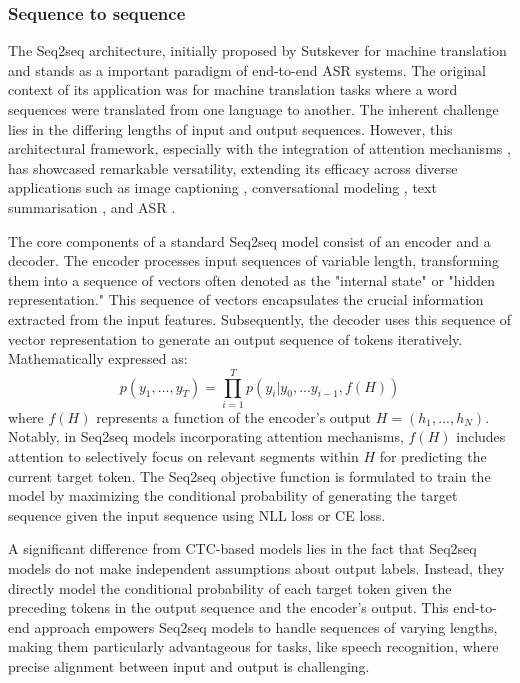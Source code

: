 \subsubsection{Sequence to sequence}
The \ac{Seq2seq} architecture, initially proposed by Sutskever for machine translation \cite{sutskever2014sequence} and stands as a important paradigm of end-to-end \ac{ASR} systems. The original context of its application was for machine translation tasks where a word sequences were translated from one language to another. The inherent challenge lies in the differing lengths of input and output sequences. However, this architectural framework, especially with the integration of attention mechanisms \cite{bahdanau2014neural}, has showcased remarkable versatility, extending its efficacy across diverse applications such as image captioning \cite{seq2seq_imagecaption}, conversational modeling \cite{vinyals2015neural}, text summarisation \cite{nallapati2016abstractive}, and \ac{ASR} \cite{dong2018speech}.

The core components of a standard \ac{Seq2seq} model consist of an encoder and a decoder. The encoder processes input sequences of variable length, transforming them into a sequence of vectors often denoted as the "internal state" or "hidden representation." This sequence of vectors encapsulates the crucial information extracted from the input features. Subsequently, the decoder uses this sequence of vector representation to generate an output sequence of tokens iteratively. Mathematically expressed as:
\begin{equation}
    p(y_1,...,y_T) = \prod_{i=1}^{T} p(y_i| y_0,...y_{i-1}, f(H))
\end{equation}
where $f(H)$ represents a function of the encoder's output $H = (h_1, ..., h_N)$. Notably, in \ac{Seq2seq} models incorporating attention mechanisms, $f(H)$ includes attention to selectively focus on relevant segments within $H$ for predicting the current target token. The \ac{Seq2seq} objective function is formulated to train the model by maximizing the conditional probability of generating the target sequence given the input sequence using \ac{NLL} loss or \ac{CE} loss.

A significant difference from \ac{CTC}-based models lies in the fact that \ac{Seq2seq} models do not make independent assumptions about output labels. Instead, they directly model the conditional probability of each target token given the preceding tokens in the output sequence and the encoder's output. This end-to-end approach empowers \ac{Seq2seq} models to handle sequences of varying lengths, making them particularly advantageous for tasks, like speech recognition, where precise alignment between input and output is challenging.


